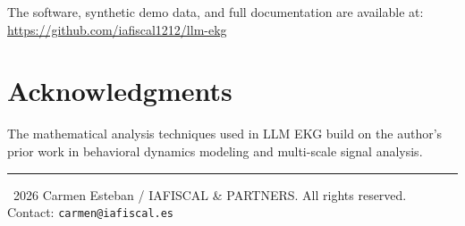 \documentclass[11pt,a4paper]{article}
\begin{document}
The software, synthetic demo data, and full documentation are available at:\\
\url{https://github.com/iafiscal1212/llm-ekg}

\section*{Acknowledgments}

The mathematical analysis techniques used in LLM EKG build on the author's prior work in behavioral dynamics modeling and multi-scale signal analysis.

\vspace{1cm}
\noindent\rule{\textwidth}{0.4pt}
\small
\noindent \textcopyright\ 2026 Carmen Esteban / IAFISCAL \& PARTNERS. All rights reserved.\\
Contact: \texttt{carmen@iafiscal.es}
\end{document}
